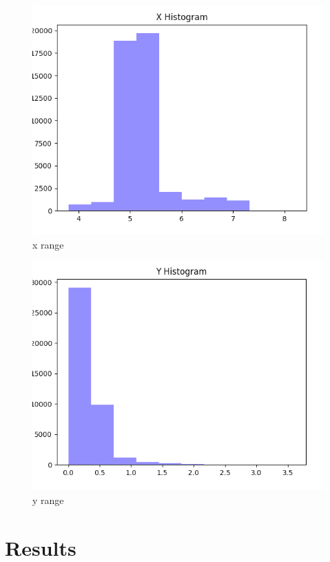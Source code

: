 \documentclass[12pt, a4paper, twocolumn, fullpage]{article}
\theoremstyle{plain}
\theoremstyle{definition}
\theoremstyle{remark}
\begin{document}
\begin{figure}
    \includegraphics[width=\linewidth]{xhist.png}
    \caption{x range}
    \label{xhist}
\end{figure}

\begin{figure}
    \includegraphics[width=\linewidth]{yhist.png}
    \caption{y range}
    \label{yhist}
\end{figure}


\section{Results}
\end{document}
